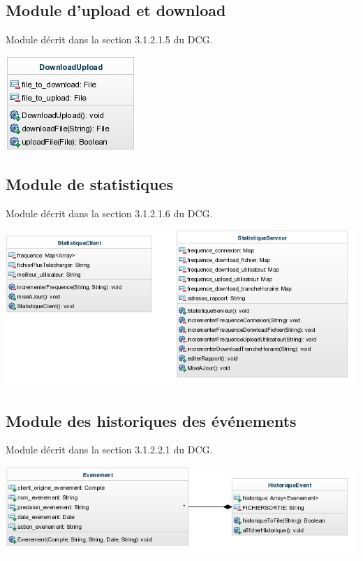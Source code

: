 \documentclass[10pt,a4paper]{report}
\begin{document}
\newpage

\subsection{Module d'upload et download}
Module décrit dans la section 3.1.2.1.5 du DCG.
\begin{center}
	\includegraphics{./Ressources/downlaodUpload.jpeg}\\
\end{center}

\hspace{5cm}

\subsection{Module de statistiques}
Module décrit dans la section 3.1.2.1.6 du DCG.
\begin{center}
	\includegraphics{./Ressources/statistique.jpeg}\\
\end{center}

\hspace{5cm}

\subsection{Module des historiques des événements}
Module décrit dans la section 3.1.2.2.1 du DCG.
\begin{center}
	\includegraphics{./Ressources/historiqueEvenement.jpeg}\\
\end{center}
\end{document}
